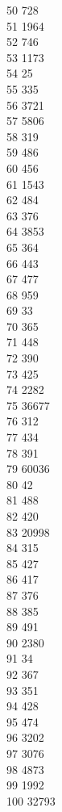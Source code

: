 { 50	728 \\
 51	1964 \\
 52	746 \\
 53	1173 \\
 54	25 \\
 55	335 \\
 56	3721 \\
 57	5806 \\
 58	319 \\
 59	486 \\
 60	456 \\
 61	1543 \\
 62	484 \\
 63	376 \\
 64	3853 \\
 65	364 \\
 66	443 \\
 67	477 \\
 68	959 \\
 69	33 \\
 70	365 \\
 71	448 \\
 72	390 \\
 73	425 \\
 74	2282 \\
 75	36677 \\
 76	312 \\
 77	434 \\
 78	391 \\
 79	60036 \\
 80	42 \\
 81	488 \\
 82	420 \\
 83	20998 \\
 84	315 \\
 85	427 \\
 86	417 \\
 87	376 \\
 88	385 \\
 89	491 \\
 90	2380 \\
 91	34 \\
 92	367 \\
 93	351 \\
 94	428 \\
 95	474 \\
 96	3202 \\
 97	3076 \\
 98	4873 \\
 99	1992 \\
 100	32793 \\
}
